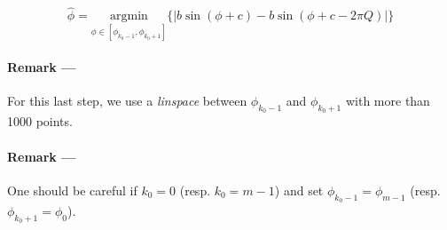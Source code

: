 \documentclass[12pt,a4paper]{article}
\begin{document}
	\begin{equation}
		\hat{\phi} =  \underset{\phi \in [\phi_{k_0-1}, \phi_{k_0+1}]}{\textrm{argmin}}\{|b \sin(\phi + c) - b\sin(\phi+c-2 \pi Q)|\}
	\end{equation}
	
	\paragraph{Remark ---} For this last step, we use a \textit{linspace} between $\phi_{k_0-1}$ and $\phi_{k_0+1}$ with more than 1000 points.
	
	\paragraph{Remark ---} One should be careful if $k_0 = 0$ (resp. $k_0 = m-1$) and set $\phi_{k_0-1} =\phi_{m-1}$ (resp. $\phi_{k_0+1} = \phi_{0}$). 
	
\end{document}
